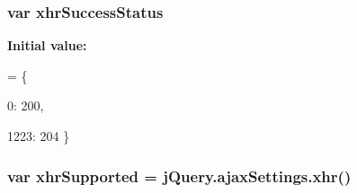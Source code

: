 \subsubsection[{\texorpdfstring{xhr\+Success\+Status}{xhrSuccessStatus}}]{\setlength{\rightskip}{0pt plus 5cm}var xhr\+Success\+Status}\hypertarget{jquery-3_82_81_8js_a4762d0058cff27281fe6b01713853fe1}{}\label{jquery-3_82_81_8js_a4762d0058cff27281fe6b01713853fe1}
{\bfseries Initial value\+:}
\begin{DoxyCode}
= \{

        
        0: 200,

        
        
        1223: 204
    \}
\end{DoxyCode}
\subsubsection[{\texorpdfstring{xhr\+Supported}{xhrSupported}}]{\setlength{\rightskip}{0pt plus 5cm}var xhr\+Supported = {\bf j\+Query.\+ajax\+Settings.\+xhr}()}\hypertarget{jquery-3_82_81_8js_a23a202c1c84174aae35f44efee37ed43}{}\label{jquery-3_82_81_8js_a23a202c1c84174aae35f44efee37ed43}
